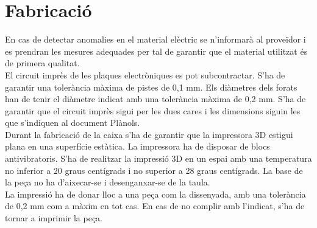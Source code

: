 \section{Fabricació}
En cas de detectar anomalies en el material elèctric se n'informarà al proveïdor i es prendran les mesures adequades per tal de garantir que el material utilitzat és de primera qualitat.\\
\newline El circuit imprès de les plaques electròniques es pot subcontractar. S'ha de garantir una tolerància màxima de pistes de 0,1 mm. Els diàmetres dels forats han de tenir el diàmetre indicat amb una tolerància màxima de 0,2 mm. S'ha de garantir que el circuit imprès sigui per les dues cares i les dimensions siguin les que s'indiquen al document Plànols.\\
\newline Durant la fabricació de la caixa s'ha de garantir que la impressora 3D estigui plana en una superfície estàtica. La impressora ha de disposar de blocs antivibratoris. S'ha de realitzar la impressió 3D en un espai amb una temperatura no inferior a 20 graus centígrads i no superior a 28 graus centígrads. La base de la peça no ha d'aixecar-se i desenganxar-se de la taula.\\
\newline La impressió ha de donar lloc a una peça com la dissenyada, amb una tolerància de 0,2 mm com a màxim en tot cas. En cas de no complir amb l'indicat, s'ha de tornar a imprimir la peça.


